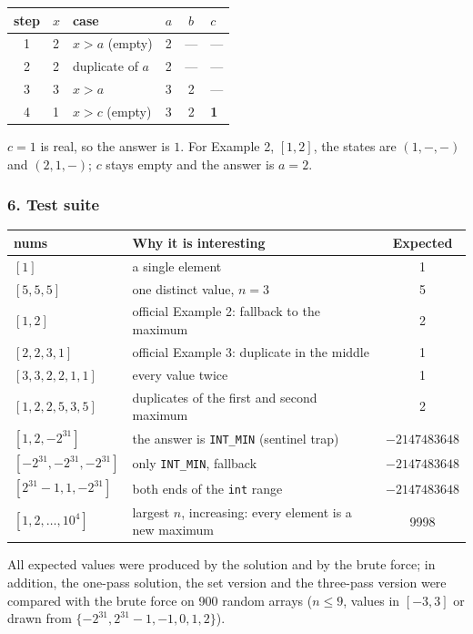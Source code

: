 \begin{tracebox}[{Example 3: $\texttt{nums} = [2, 2, 3, 1]$}]
\centering
\small
\begin{tabular}{@{}clllcl@{}}
\toprule
\textbf{step} & $x$ & \textbf{case} & $a$ & $b$ & $c$ \\
\midrule
1 & 2 & $x > a$ (empty) & 2 & --- & --- \\
2 & 2 & duplicate of $a$ & 2 & --- & --- \\
3 & 3 & $x > a$ & 3 & 2 & --- \\
4 & 1 & $x > c$ (empty) & 3 & 2 & \textbf{1} \\
\bottomrule
\end{tabular}
\quad
\begin{minipage}{0.4\linewidth}\small
$c = 1$ is real, so the answer is $1$. For Example 2, $[1, 2]$, the states are $(1,-,-)$ and $(2,1,-)$; $c$ stays empty and the answer is $a = 2$.
\end{minipage}
\end{tracebox}

\subsubsection*{6. Test suite}

\begin{testbox}
\centering\small
\begin{tabular}{@{}llc@{}}
\toprule
\textbf{nums} & \textbf{Why it is interesting} & \textbf{Expected} \\
\midrule
$[1]$ & a single element & 1 \\
$[5, 5, 5]$ & one distinct value, $n = 3$ & 5 \\
$[1, 2]$ & official Example 2: fallback to the maximum & 2 \\
$[2, 2, 3, 1]$ & official Example 3: duplicate in the middle & 1 \\
$[3, 3, 2, 2, 1, 1]$ & every value twice & 1 \\
$[1, 2, 2, 5, 3, 5]$ & duplicates of the first and second maximum & 2 \\
$[1, 2, -2^{31}]$ & the answer is \texttt{INT\_MIN} (sentinel trap) & $-2147483648$ \\
$[-2^{31}, -2^{31}, -2^{31}]$ & only \texttt{INT\_MIN}, fallback & $-2147483648$ \\
$[2^{31}-1, 1, -2^{31}]$ & both ends of the \texttt{int} range & $-2147483648$ \\
$[1, 2, \dots, 10^4]$ & largest $n$, increasing: every element is a new maximum & 9998 \\
\bottomrule
\end{tabular}
\end{testbox}
All expected values were produced by the solution and by the brute force; in addition, the one-pass solution, the set version and the three-pass version were compared with the brute force on 900 random arrays ($n \le 9$, values in $[-3, 3]$ or drawn from $\{-2^{31}, 2^{31}-1, -1, 0, 1, 2\}$).


